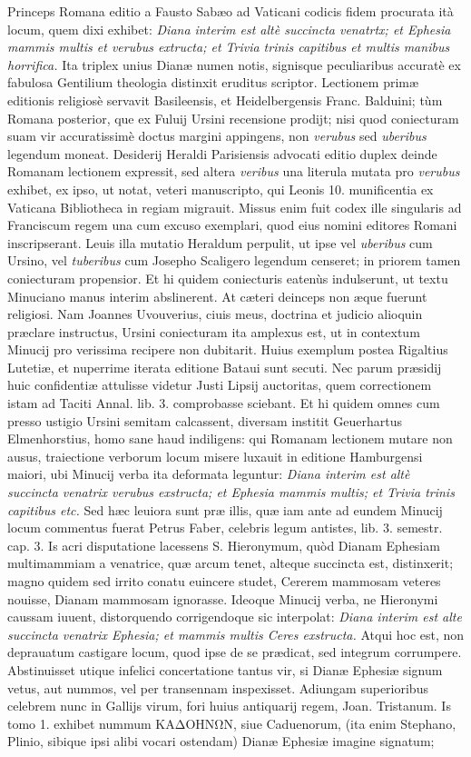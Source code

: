 \documentclass[a4paper, 11pt, oneside, polutonikogreek, latin]{article}
\begin{document}
Princeps Romana editio a Fausto Sabæo ad Vaticani codicis fidem procurata ità locum, quem dixi exhibet: \emph{Diana interim est altè succincta venatrtx; et Ephesia mammis multis et verubus extructa; et Trivia trinis capitibus et multis manibus horrifica.} Ita triplex unius Dianæ numen notis, signisque peculiaribus accuratè ex fabulosa Gentilium theologia distinxit eruditus scriptor. Lectionem primæ editionis religiosè servavit Basileensis, et Heidelbergensis Franc. Balduini; tùm Romana posterior, que ex Fuluij Ursini recensione prodijt; nisi quod coniecturam suam vir accuratissimè doctus margini appingens, non \emph{verubus} sed \emph{uberibus} legendum moneat. Desiderij Heraldi Parisiensis advocati editio duplex deinde Romanam lectionem expressit, sed altera \emph{veribus} una literula mutata pro \emph{verubus} exhibet, ex ipso, ut notat, veteri manuscripto, qui Leonis 10. munificentia ex Vaticana Bibliotheca in regiam migrauit. Missus enim fuit codex ille singularis ad Franciscum regem una cum excuso exemplari, quod eius nomini editores Romani inscripserant. Leuis illa mutatio Heraldum perpulit, ut ipse vel \emph{uberibus} cum Ursino, vel \emph{tuberibus} cum Josepho Scaligero legendum censeret; in priorem tamen coniecturam propensior. Et hi quidem coniecturis eatenùs indulserunt, ut textu Minuciano manus interim abslinerent. At cæteri deinceps non æque fuerunt religiosi. Nam Joannes Uvouverius, ciuis meus, doctrina et judicio alioquin præclare instructus, Ursini coniecturam ita amplexus est, ut in contextum Minucij pro verissima recipere non dubitarit. Huius exemplum postea Rigaltius Lutetiæ, et nuperrime iterata editione Bataui sunt secuti. Nec parum præsidij huic confidentiæ attulisse videtur Justi Lipsij auctoritas, quem correctionem istam ad Taciti Annal. lib. 3. comprobasse sciebant. Et hi quidem omnes cum presso ustigio Ursini semitam calcassent, diversam institit Geuerhartus Elmenhorstius, homo sane haud indiligens: qui Romanam lectionem mutare non ausus, traiectione verborum locum misere luxauit in editione Hamburgensi maiori, ubi Minucij verba ita deformata leguntur: \emph{Diana interim est altè succincta venatrix verubus exstructa; et Ephesia mammis multis; et Trivia trinis capitibus etc.} Sed hæc leuiora sunt præ illis, quæ iam ante ad eundem Minucij locum commentus fuerat Petrus Faber, celebris legum antistes, lib. 3. semestr. cap. 3. Is acri disputatione lacessens S. Hieronymum, quòd Dianam Ephesiam multimammiam a venatrice, quæ arcum tenet, alteque succincta est, distinxerit; magno quidem sed irrito conatu euincere studet, Cererem mammosam veteres nouisse, Dianam mammosam ignorasse. Ideoque Minucij verba, ne Hieronymi caussam iuuent, distorquendo corrigendoque sic interpolat: \emph{Diana interim est alte succincta venatrix Ephesia; et mammis multis Ceres exstructa.} Atqui hoc est, non deprauatum castigare locum, quod ipse de se prædicat, sed integrum corrumpere. Abstinuisset utique infelici concertatione tantus vir, si Dianæ Ephesiæ signum vetus, aut nummos, vel per transennam inspexisset. Adiungam superioribus celebrem nunc in Gallijs virum, fori huius antiquarij regem, Joan. Tristanum. Is tomo 1. exhibet nummum \foreignlanguage{greek}{ΚΑΔΟΗΝΩΝ}, siue Caduenorum, (ita enim Stephano, Plinio, sibique ipsi alibi vocari ostendam) Dianæ Ephesiæ imagine signatum; 
\end{document}
